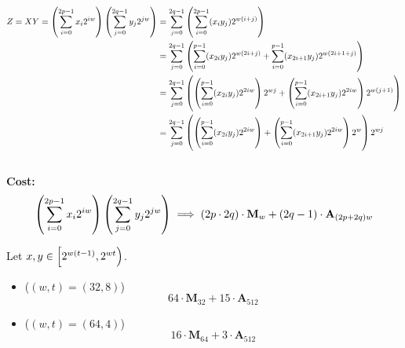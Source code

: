 \begin{align*}
Z=XY=\left(\sum_{i=0}^{2p-1}x_i2^{iw}\right)\left(\sum_{j=0}^{2q-1}y_j2^{jw}\right)&=\sum_{j=0}^{2q-1}\left(\sum_{i=0}^{2p-1}(x_iy_j)2^{w(i+j)}\right) \\
&=\sum_{j=0}^{2q-1}\left(\sum_{i=0}^{p-1}(x_{2i}y_j)2^{w(2i+j)}+\sum_{i=0}^{p-1}(x_{2i+1}y_j)2^{w(2i+1+j)}\right) \\
&=\sum_{j=0}^{2q-1}\left(\left(\sum_{i=0}^{p-1}(x_{2i}y_j)2^{2iw}\right)2^{wj}+\left(\sum_{i=0}^{p-1}(x_{2i+1}y_j)2^{2iw}\right)2^{w(j+1)}\right) \\
&=\sum_{j=0}^{2q-1}\left(\left(\sum_{i=0}^{p-1}(x_{2i}y_j)2^{2iw}\right)+\left(\sum_{i=0}^{p-1}(x_{2i+1}y_j)2^{2iw}\right)2^{w}\right)2^{wj} \\
\end{align*}
\\
\textbf{Cost:} \[
\left(\sum_{i=0}^{2p-1}x_i2^{iw}\right)\left(\sum_{j=0}^{2q-1}y_j2^{jw}\right)\implies (2p\cdot 2q)\cdot\textbf{M}_{w} + (2q-1)\cdot\textbf{A}_{(2p+2q)w}
\]

\begin{example}
Let $x,y\in\intco{2^{w(t-1)},2^{wt}}$.
\begin{itemize}
\item[] ($(w,t)=(32,8)$) \[
64\cdot\textbf{M}_{32} + 15\cdot\textbf{A}_{512}
\]
\item[] ($(w,t)=(64,4)$) \[
16\cdot\textbf{M}_{64} + 3\cdot\textbf{A}_{512}
\]
\end{itemize}
\end{example}

